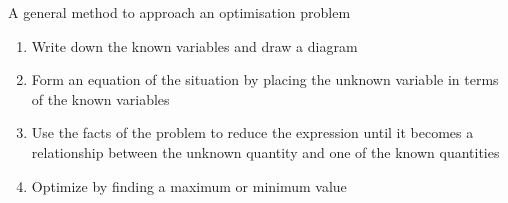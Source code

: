\begin{tcolorbox}
	A general method to approach an optimisation problem             
	\begin{enumerate}
		\item Write down the known variables and draw a diagram
		\item Form an equation of the situation by placing the unknown variable in terms of the known variables
		\item Use the facts of the problem to reduce the expression until it becomes a relationship between the unknown quantity and one of the known quantities
		\item Optimize by finding a maximum or minimum value
	\end{enumerate}
\end{tcolorbox}

